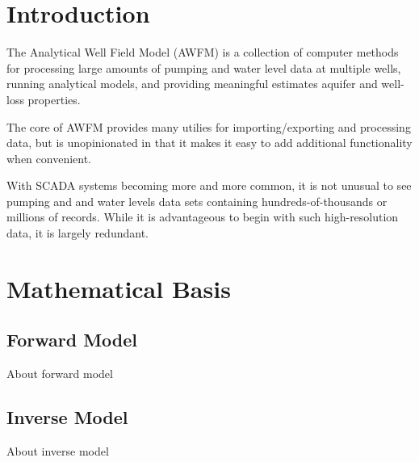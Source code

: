 \documentclass{tufte-book} %
\begin{document}


\cleardoublepage
\chapter*{Introduction} %

The Analytical Well Field Model (AWFM) is a collection of computer methods for processing
large amounts of pumping and water level data at multiple wells, running analytical models,
and providing meaningful estimates aquifer and well-loss properties.

The core of AWFM provides many utilies for importing/exporting and processing data, but 
is unopinionated in that it makes it easy to add additional functionality when convenient.

With SCADA systems becoming more and more common, it is not unusual to see pumping and 
and water levels data sets containing hundreds-of-thousands or millions of records. While it is
advantageous to begin with such high-resolution data, it is largely redundant. 

\mainmatter


\chapter{Mathematical Basis}

\section{Forward Model}
About forward model

\section{Inverse Model}
About inverse model
\end{document}
